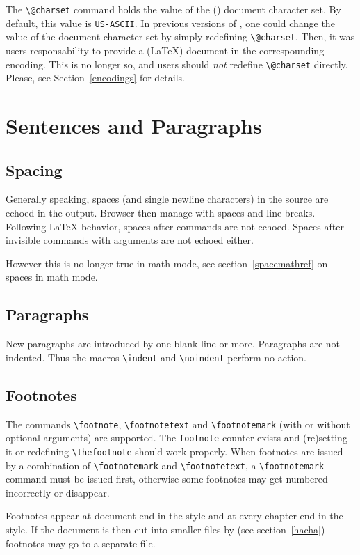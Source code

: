 The \verb+\@charset+ command holds the value of the (\html) document character
set. By default, this value is \texttt{US-ASCII}.
In previous versions of \hevea{}, one could change the
value of the document character set by simply redefining
\verb+\@charset+. Then, it was users responsability to provide a
(\LaTeX) document in the correspounding encoding.
This is no longer so, and users should \emph{not} redefine
\verb+\@charset+ directly. Please, see Section~\ref{encodings} for details.


\section{Sentences and Paragraphs}

\subsection{Spacing}
Generally speaking, spaces (and single newline characters) in the
source are echoed in the output.  Browser then manage with spaces and
line-breaks.  Following \LaTeX{} behavior, spaces after commands are
not echoed.  Spaces after invisible commands with arguments are not
echoed either.


However this is no longer true in math mode, see
section~\ref{spacemathref} on spaces in math mode.


\subsection{Paragraphs}
New paragraphs are introduced by one blank line or more.
Paragraphs are not indented. Thus the macros \verb+\indent+ and
\verb+\noindent+ perform no action.

\subsection{Footnotes}
The commands \verb+\footnote+,
\verb+\footnotetext+ and \verb+\footnotemark+ (with or without
optional arguments) are supported.
The \verb+footnote+ counter exists and (re)setting it or redefining
\verb+\thefootnote+ should work properly.
When footnotes are issued by a combination of \verb+\footnotemark+ and
\verb+\footnotetext+, a \verb+\footnotemark+
command must be issued
first, otherwise some footnotes may get numbered incorrectly or disappear.

Footnotes appear at document end in the  style and
at every chapter end in the  style.
If the document is then cut into smaller files by \hacha{} (see
section~\ref{hacha}) footnotes may go to a separate file.

